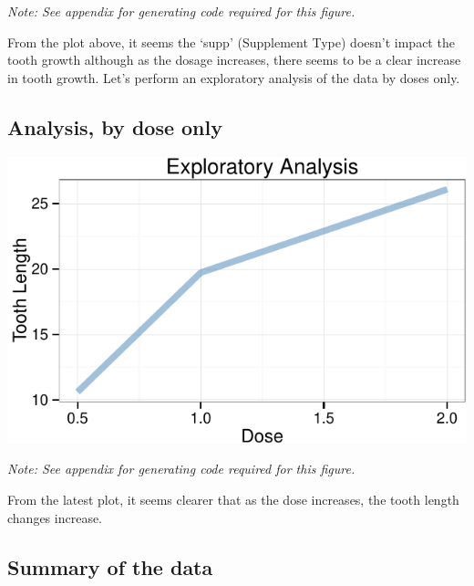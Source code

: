 \documentclass[]{article}
\newenvironment{Shaded}{\begin{snugshade}}{\end{snugshade}}
\newcommand{\KeywordTok}[1]{\textcolor[rgb]{0.13,0.29,0.53}{\textbf{{#1}}}}
\newcommand{\DataTypeTok}[1]{\textcolor[rgb]{0.13,0.29,0.53}{{#1}}}
\newcommand{\StringTok}[1]{\textcolor[rgb]{0.31,0.60,0.02}{{#1}}}
\newcommand{\CommentTok}[1]{\textcolor[rgb]{0.56,0.35,0.01}{\textit{{#1}}}}
\newcommand{\NormalTok}[1]{{#1}}
\begin{document}
\emph{Note: See appendix for generating code required for this figure.}

From the plot above, it seems the `supp' (Supplement Type) doesn't
impact the tooth growth although as the dosage increases, there seems to
be a clear increase in tooth growth. Let's perform an exploratory
analysis of the data by doses only.

\subsection{Analysis, by dose only}\label{analysis-by-dose-only}

\begin{Shaded}
\end{Shaded}

\includegraphics{statinference-courseproject-1-Question-2_files/figure-latex/unnamed-chunk-4-1.pdf}

\emph{Note: See appendix for generating code required for this figure.}

From the latest plot, it seems clearer that as the dose increases, the
tooth length changes increase.

\subsection{Summary of the data}\label{summary-of-the-data}
\end{document}
